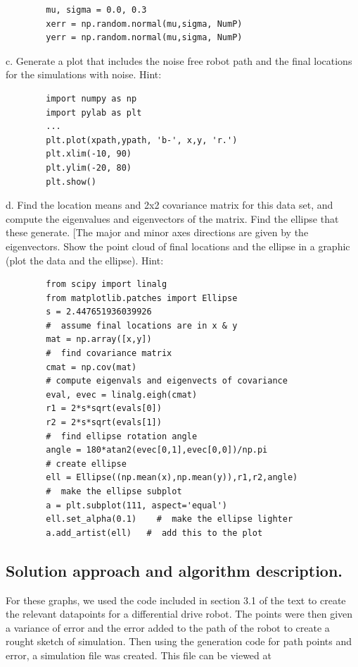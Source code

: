 \documentclass[letterpaper,11pt]{texMemo} %
\begin{document}
\begin{tiny}
    \begin{lstlisting}
        mu, sigma = 0.0, 0.3
        xerr = np.random.normal(mu,sigma, NumP)
        yerr = np.random.normal(mu,sigma, NumP)
    \end{lstlisting}
\end{tiny}

c. Generate a plot that includes the noise free robot path and the final locations for the
simulations with noise. Hint:

\begin{tiny}
    \begin{lstlisting}
        import numpy as np
        import pylab as plt
        ...
        plt.plot(xpath,ypath, 'b-', x,y, 'r.')
        plt.xlim(-10, 90)
        plt.ylim(-20, 80)
        plt.show()
    \end{lstlisting}
\end{tiny}

d. Find the location means and 2x2 covariance matrix for this data set, and compute the eigenvalues
and eigenvectors of the matrix. Find the ellipse that these generate. [The major and minor axes
directions are given by the eigenvectors. Show the point cloud of final locations and the ellipse 
in a graphic (plot the data and the ellipse). Hint:

\begin{tiny}
    \begin{lstlisting}
        from scipy import linalg
        from matplotlib.patches import Ellipse
        s = 2.447651936039926
        #  assume final locations are in x & y
        mat = np.array([x,y])
        #  find covariance matrix
        cmat = np.cov(mat)
        # compute eigenvals and eigenvects of covariance
        eval, evec = linalg.eigh(cmat)
        r1 = 2*s*sqrt(evals[0])
        r2 = 2*s*sqrt(evals[1])
        #  find ellipse rotation angle
        angle = 180*atan2(evec[0,1],evec[0,0])/np.pi
        # create ellipse
        ell = Ellipse((np.mean(x),np.mean(y)),r1,r2,angle)
        #  make the ellipse subplot
        a = plt.subplot(111, aspect='equal')
        ell.set_alpha(0.1)    #  make the ellipse lighter
        a.add_artist(ell)   #  add this to the plot
    \end{lstlisting}
\end{tiny}

\subsection*{Solution approach and algorithm description.}
For these graphs, we used the code included in section 3.1 of the text to create the relevant
datapoints for a differential drive robot. The points were then given a variance of error and the 
error added to the path of the robot to create a rought sketch of simulation. Then using the generation 
code for path points and error, a simulation file was created. This file can be viewed at 
\end{document}
